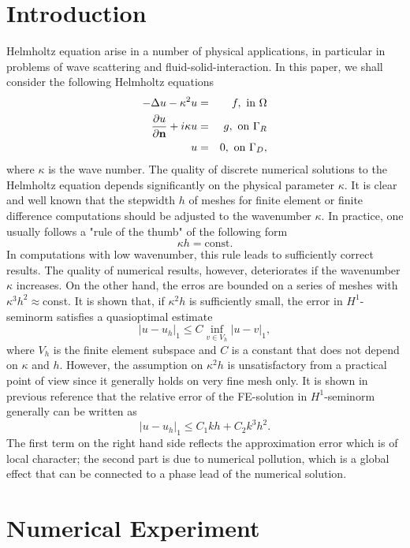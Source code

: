 \documentclass[preprint,11pt]{elsarticle}
\newcommand{\bn}{{\bf n}}
\def\bn{{\bf n}}
\begin{document}
\section{Introduction}\label{Sect:Intro}
Helmholtz equation arise in a number of physical applications, in particular in problems of wave scattering and fluid-solid-interaction.
In this paper, we shall consider the following Helmholtz equations 
\begin{eqnarray}
-\Delta u - \kappa^2 u &=& f,\text{ in }\Omega \\
\frac{\partial u}{\partial\bn} + i\kappa u &=& g, \text{ on }\Gamma_R\\
u &=&  0,\text{ on }\Gamma_D,
\end{eqnarray}
where $\kappa$ is the wave number. The quality of discrete numerical solutions to the Helmholtz equation depends significantly on the physical parameter $\kappa$. It is clear and well known that the stepwidth $h$ of meshes for finite element or finite difference computations should be adjusted to the wavenumber $\kappa$. In practice, one usually follows a "rule of the thumb" of the following form
$$\kappa h = \text{const}.$$
In computations with low wavenumber, this rule leads to sufficiently correct results. The quality of numerical results, however, deteriorates if the wavenumber $\kappa$ increases. On the other hand, the erros are bounded on a series of meshes with $\kappa^3h^2\approx$const. It is shown that, if $\kappa^2h$ is sufficiently small, the error in $H^1$-seminorm satisfies a quasioptimal estimate
$$|u-u_{h}|_1\le C\inf_{v\in V_h}|u-v|_1,$$
where $V_h$ is the finite element subspace and $C$ is a constant that does not depend on $\kappa$ and $h.$ However, the assumption on $\kappa^2h$ is unsatisfactory from a practical point of view since it generally holds on very fine mesh only. It is shown in previous reference that the relative error of the FE-solution in $H^1$-seminorm generally can be written as
$$|u-u_h|_1\le C_1kh+C_2k^3h^2.$$
The first term on the right hand side reflects the approximation error which is of local character; the second part is due to numerical pollution, which is a global effect that can be connected to a phase lead of the numerical solution. 

\section{Numerical Experiment}\label{Sect:NumTest}
\end{document}
